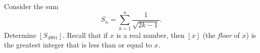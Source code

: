 Consider the sum \[S_n=\displaystyle\sum_{k=1}^n\frac{1}{\sqrt{2k-1}}.\] Determine $\left\lfloor S_{4901}\right\rfloor$. Recall that if $x$ is a real number, then $\left\lfloor x\right\rfloor$ (the \emph{floor} of $x$) is the greatest integer that is less than or equal to $x$.